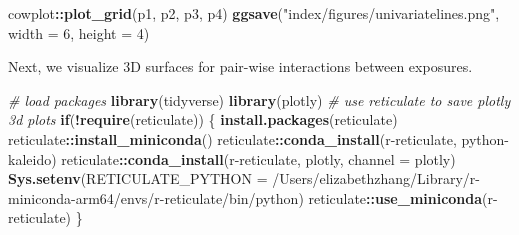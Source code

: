 \documentclass[12pt, twoside]{amherstthesis}
\newenvironment{Shaded}{\begin{snugshade}}{\end{snugshade}}
\newcommand{\AttributeTok}[1]{\textcolor[rgb]{0.13,0.29,0.53}{#1}}
\newcommand{\CommentTok}[1]{\textcolor[rgb]{0.56,0.35,0.01}{\textit{#1}}}
\newcommand{\ControlFlowTok}[1]{\textcolor[rgb]{0.13,0.29,0.53}{\textbf{#1}}}
\newcommand{\DecValTok}[1]{\textcolor[rgb]{0.00,0.00,0.81}{#1}}
\newcommand{\FunctionTok}[1]{\textcolor[rgb]{0.13,0.29,0.53}{\textbf{#1}}}
\newcommand{\NormalTok}[1]{#1}
\newcommand{\SpecialCharTok}[1]{\textcolor[rgb]{0.81,0.36,0.00}{\textbf{#1}}}
\newcommand{\StringTok}[1]{\textcolor[rgb]{0.31,0.60,0.02}{#1}}
\begin{document}
\begin{Shaded}
\begin{Highlighting}[]
\NormalTok{cowplot}\SpecialCharTok{::}\FunctionTok{plot\_grid}\NormalTok{(p1, p2, p3, p4)}
\FunctionTok{ggsave}\NormalTok{(}\StringTok{"index/figures/univariatelines.png"}\NormalTok{, }\AttributeTok{width =} \DecValTok{6}\NormalTok{, }\AttributeTok{height =} \DecValTok{4}\NormalTok{)}
\end{Highlighting}
\end{Shaded}
\normalsize

Next, we visualize 3D surfaces for pair-wise interactions between exposures.

\scriptsize
\begin{Shaded}
\begin{Highlighting}[]
\CommentTok{\# load packages}
\FunctionTok{library}\NormalTok{(tidyverse)}
\FunctionTok{library}\NormalTok{(plotly)}
\CommentTok{\# use reticulate to save plotly 3d plots}
\ControlFlowTok{if}\NormalTok{(}\SpecialCharTok{!}\FunctionTok{require}\NormalTok{(reticulate)) \{}
  \FunctionTok{install.packages}\NormalTok{(}\StringTok{\textquotesingle{}reticulate\textquotesingle{}}\NormalTok{)}
\NormalTok{  reticulate}\SpecialCharTok{::}\FunctionTok{install\_miniconda}\NormalTok{()}
\NormalTok{  reticulate}\SpecialCharTok{::}\FunctionTok{conda\_install}\NormalTok{(}\StringTok{\textquotesingle{}r{-}reticulate\textquotesingle{}}\NormalTok{, }\StringTok{\textquotesingle{}python{-}kaleido\textquotesingle{}}\NormalTok{)}
\NormalTok{  reticulate}\SpecialCharTok{::}\FunctionTok{conda\_install}\NormalTok{(}\StringTok{\textquotesingle{}r{-}reticulate\textquotesingle{}}\NormalTok{, }\StringTok{\textquotesingle{}plotly\textquotesingle{}}\NormalTok{, }\AttributeTok{channel =} \StringTok{\textquotesingle{}plotly\textquotesingle{}}\NormalTok{)}
  \FunctionTok{Sys.setenv}\NormalTok{(}\AttributeTok{RETICULATE\_PYTHON =} 
               \StringTok{\textquotesingle{}/Users/elizabethzhang/Library/r{-}miniconda{-}arm64/envs/r{-}reticulate/bin/python\textquotesingle{}}\NormalTok{)}
\NormalTok{  reticulate}\SpecialCharTok{::}\FunctionTok{use\_miniconda}\NormalTok{(}\StringTok{\textquotesingle{}r{-}reticulate\textquotesingle{}}\NormalTok{)}
\NormalTok{\}}
\end{Highlighting}
\end{Shaded}
\normalsize
\end{document}

